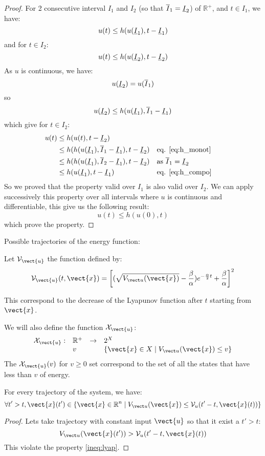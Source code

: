 \begin{proof}
For 2 consecutive interval $I_1$ and $I_2$ (so that $\overline{I}_1 = \underline{I}_2$) of $\mathbb{R}^+$, and $t \in I_1$, we have:
$$u(t) \leq  h(u(\underline{I}_1),t-\underline{I}_1)$$
and for $t \in I_2$:
$$u(t) \leq  h(u(\underline{I}_2),t-\underline{I}_2)$$
As $u$ is continuous, we have:
$$u(\underline{I}_2) = u(\overline{I}_1)$$
so
$$u(\underline{I}_2) \leq h(u(\underline{I}_1),\overline{I}_1-\underline{I}_1)$$
which give for $t \in I_2$:
\begin{align*}
u(t) &\leq h(u(t),t-\underline{I}_2) \\
&\leq h(h(u(\underline{I}_1),\overline{I}_1-\underline{I}_1), t - \underline{I}_2) && \text{eq. \ref{eq:h_monot}}\\
&\leq h(h(u(\underline{I}_1),\overline{I}_2-\underline{I}_1), t - \underline{I}_2) && \text{as $\overline{I}_1=\underline{I}_2$}\\
& \leq h(u(\underline{I}_1), t - \underline{I}_1) && \text{eq. \ref{eq:h_compo} }
\end{align*}
So we proved that the property valid over $I_1$ is also valid over $I_2$.
We can apply successively this property over all intervals where $u$ is continuous and differentiable, this give us the following result:
$$u(t) \leq h(u(0),t)$$
which prove the property.
\end{proof}

Possible trajectories of the energy function:


\newcommand{\Vub}{\mathcal{V}_{\vect{u}}}
Let $\Vub$ the function defined by:
$$\Vub(t,\vect{x}) =  \left[ (\sqrt{\Vu(\vect{x})} - \frac{\beta}{\alpha}) e^{-\frac{\alpha}{2} t} + \frac{\beta}{\alpha} \right] ^2$$

This correspond to the decrease of the Lyapunov function after $t$ starting from $\vect{x}$.

\newcommand{\Xu}{\mathcal{X}_{\vect{u}}}
We will also define the function $\Xu$:
\begin{equation}
\begin{array}{llll}
\Xu:& \mathbb{R}^+ 	&\rightarrow 	& 2^X\\
	& v 				& 				& \{\vect{x} \in X \mid \Vu(\vect{x}) \leq v\}
\end{array}
\end{equation}
The $\Xu(v)$ for $v\geq0$ set correspond to the set of all the states that have less than $v$ of energy.


\begin{prop}
For every trajectory of the system, we have:
$$\forall t'>t,\vect{x}(t') \in \{\vect{x} \in \mathbb{R}^n \mid \Vu(\vect{x}) \leq \mathcal{V}_u(t'-t,\vect{x}(t))\}$$
\end{prop}

\begin{proof}
Lets take trajectory with constant input $\vect{u}$ so that it exist a $t'>t$:
$$\Vu(\vect{x}(t'))>\mathcal{V}_u(t'-t,\vect{x}(t))$$
This violate the property \ref{ineq:lyap}.
\end{proof}

